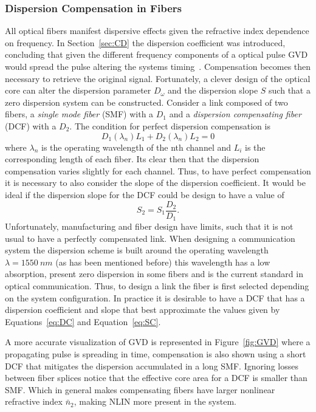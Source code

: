 \subsubsection{Dispersion Compensation in Fibers}\label{sec:DisCom}
 All optical fibers manifest dispersive effects given the  refractive index dependence on frequency. In Section~\ref{sec:CD} the dispersion coefficient was introduced, concluding that given the different frequency components of a optical pulse GVD would spread the pulse altering the systems timing~\cite{goldfarb2007chromatic}. Compensation becomes then necessary to retrieve the original signal. Fortunately, a clever design of the optical core can alter the dispersion parameter $D_\omega$ and the dispersion slope $S$ such that a zero dispersion system can be constructed. Consider a link composed of two fibers, a \textit{single mode fiber }(SMF) with a $D_{1}$ and a \textit{dispersion compensating fiber} (DCF) with a $D_{2}$. The condition for perfect dispersion compensation is 
\begin{equation}
D_{1}(\lambda_{n})L_{1}+D_{2}(\lambda_{n})L_{2}=0\label{eq:DC}
\end{equation}
where $\lambda_{n}$ is the operating wavelength of the nth channel and $L_{i}$ is the corresponding length of each fiber. Its clear then that the dispersion compensation varies slightly for each channel. Thus, to have  perfect compensation it is necessary to also consider the slope of the dispersion coefficient. It would be ideal if the dispersion slope for the DCF could be design to have a value of
\begin{equation}
S_{2}=S_{1}\frac{D_{2}}{D_{1}}.\label{eq:SC}
\end{equation}
\indent Unfortunately, manufacturing and fiber design have limits, such that it is not usual to have a perfectly compensated link. When designing a communication system the dispersion scheme is built around the operating wavelength $\lambda=1550~nm$ (as has been mentioned before) this wavelength has a low absorption, present zero dispersion in some fibers and is the current standard in optical communication. Thus, to design a link the fiber is first selected depending on the system configuration. In practice it is desirable to have a DCF that has a dispersion coefficient and slope that best approximate the values given by Equations~\ref{eq:DC} and Equation~\ref{eq:SC}. 

A more accurate visualization of GVD is represented in Figure~\ref{fig:GVD} where a propagating pulse is spreading in time, compensation is also shown using a short DCF that mitigates the dispersion accumulated in a long SMF. Ignoring losses between fiber splices notice that the effective core area for a DCF is smaller than SMF. Which in general makes compensating fibers have larger nonlinear refractive index $\bar{n}_{2}$, making NLIN more present in the system. 


